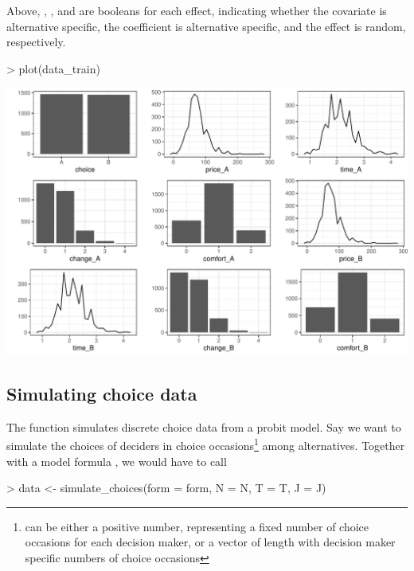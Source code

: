 \documentclass[article]{jss}
\newcommand{\fct}[1]{\code{#1()}}
\begin{document}
Above, , , and  are booleans for each effect, indicating whether the covariate is alternative specific, the coefficient is alternative specific, and the effect is random, respectively.

\begin{Schunk}
\begin{Sinput}
> plot(data_train)
\end{Sinput}
\end{Schunk}
\includegraphics{rprobitb_oelschlaeger_bauer-train-data}

\subsection{Simulating choice data} \label{subsec:simulate_choice_data}

The \fct{simulate\_choices} function simulates discrete choice data from a probit model. Say we want to simulate the choices of  deciders in  choice occasions\footnote{ can be either a positive number, representing a fixed number of choice occasions for each decision maker, or a vector of length  with decision maker specific numbers of choice occasions} among  alternatives. Together with a model formula , we would have to call

\begin{Schunk}
\begin{Sinput}
> data <- simulate_choices(form = form, N = N, T = T, J = J)
\end{Sinput}
\end{Schunk}
\end{document}
